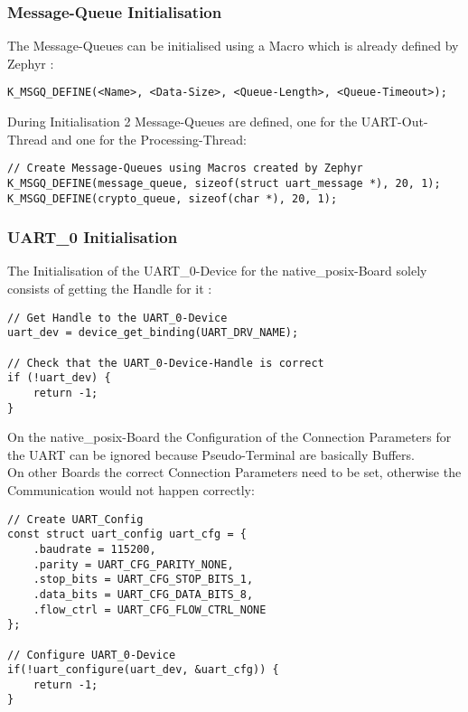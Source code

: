 \subsubsection{Message-Queue Initialisation}

The Message-Queues can be initialised using a Macro which
is already defined by Zephyr :
\\
\begin{lstlisting}[style=CStyle, caption=Message Queue Initialisation]
K_MSGQ_DEFINE(<Name>, <Data-Size>, <Queue-Length>, <Queue-Timeout>);
\end{lstlisting}
During Initialisation 2 Message-Queues are defined, one for
the UART-Out-Thread and one for the Processing-Thread:
\\
\begin{lstlisting}[style=CStyle]
// Create Message-Queues using Macros created by Zephyr
K_MSGQ_DEFINE(message_queue, sizeof(struct uart_message *), 20, 1);
K_MSGQ_DEFINE(crypto_queue, sizeof(char *), 20, 1);
\end{lstlisting}

\subsubsection{UART\_0 Initialisation}

The Initialisation of the UART\_0-Device for the native\_posix-Board
solely consists of getting the Handle for it :
\\
\begin{lstlisting}[style=CStyle,caption=UART 0 Initialisation]
// Get Handle to the UART_0-Device
uart_dev = device_get_binding(UART_DRV_NAME);

// Check that the UART_0-Device-Handle is correct
if (!uart_dev) {
	return -1;
}
\end{lstlisting}

\pagebreak

On the native\_posix-Board the Configuration of the Connection Parameters
for the UART can be ignored because Pseudo-Terminal are basically Buffers.
\\
On other Boards the correct Connection Parameters need to be set, otherwise
the Communication would not happen correctly:
\\
\begin{lstlisting}[style=CStyle, caption=UART-0 Configuration]
// Create UART_Config
const struct uart_config uart_cfg = {
	.baudrate = 115200,
	.parity = UART_CFG_PARITY_NONE,
	.stop_bits = UART_CFG_STOP_BITS_1,
	.data_bits = UART_CFG_DATA_BITS_8,
	.flow_ctrl = UART_CFG_FLOW_CTRL_NONE
};

// Configure UART_0-Device
if(!uart_configure(uart_dev, &uart_cfg)) {
	return -1;
}
\end{lstlisting}

